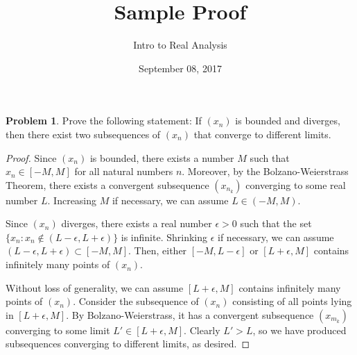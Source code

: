 \documentclass{amsart}
\newcommand{\+}[1]{\ensuremath{\mathbf{#1}}}
\theoremstyle{definition}
\newtheorem{prob}{Problem}
\begin{document}
\title{Sample Proof}
\date{September 08, 2017}
\author{Intro to Real Analysis}

\maketitle



\begin{prob}
Prove the following statement:
If $(x_n)$ is bounded and diverges, then there exist two subsequences of $(x_n)$ that converge 
  to different limits.
\end{prob}

\begin{proof}
 Since $(x_n)$ is bounded, there exists a number $M$ such that $x_n \in [-M,M]$ for all natural numbers $n$.
 Moreover, by the Bolzano-Weierstrass Theorem, there exists a convergent
 subsequence $(x_{n_k})$ converging to some real number $L$.
 Increasing $M$ if necessary, we can assume $L \in (-M,M)$.
 
 Since $(x_n)$ diverges, there exists a real number $\epsilon > 0$ such that
 the set $\{x_n: x_n \not\in (L-\epsilon, L+\epsilon)\}$ is infinite.
 Shrinking $\epsilon$ if necessary, we can assume $(L-\epsilon, L+\epsilon) \subset [-M,M]$.
 Then, either $[-M, L-\epsilon]$ or $[L+\epsilon, M]$ contains infinitely many points of $(x_n)$.
 
 Without loss of generality, we can assume $[L+\epsilon, M]$ contains infinitely many points of $(x_n)$.
 Consider the subsequence of $(x_n)$ consisting of all points lying in $[L+\epsilon, M]$.
 By Bolzano-Weierstrass, it has a convergent subsequence $(x_{m_k})$ converging to some
 limit $L' \in [L+\epsilon, M]$.  Clearly $L' > L$, so we have produced
 subsequences converging to different limits, as desired.
\end{proof}
\end{document}
